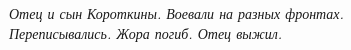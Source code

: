 \begin{figure}[h!]
\begin{minipage}{75mm}
\begin{minipage}[h!]{36mm}
        \end{minipage}
      
      
        \vspace{-10pt}
        \textit{\footnotesize{Отец и сын Короткины. Воевали на разных фронтах. Переписывались. Жора погиб. Отец выжил.}}  
      
    \end{minipage}
    \hspace{3mm}
    \begin{minipage}[h!]{37mm}
    
        \vspace{10pt}
    

\end{minipage}
\end{figure}

